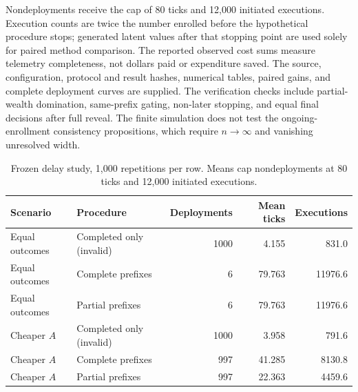 Nondeployments receive the cap of 80 ticks and 12,000 initiated executions.
Execution counts are twice the number enrolled before the hypothetical
procedure stops; generated latent values after that stopping point are
used solely for paired method comparison. The reported observed cost
sums measure telemetry completeness, not dollars paid or expenditure
saved. The source, configuration, protocol and result hashes, numerical
tables, paired gains, and complete deployment curves are supplied.
The verification checks include partial-wealth domination, same-prefix
gating, non-later stopping, and equal final decisions after full reveal.
The finite simulation does not test the ongoing-enrollment consistency
propositions, which require $n\to\infty$ and vanishing unresolved width.

\begin{table}[h]
\centering\small
\caption{Frozen delay study, 1,000 repetitions per row. Means cap
nondeployments at 80 ticks and 12,000 initiated executions.}
\begin{tabular}{llrrr}
\toprule
Scenario & Procedure & Deployments & Mean ticks & Executions\\
\midrule
Equal outcomes & Completed only (invalid) & 1000 & 4.155 & 831.0\\
Equal outcomes & Complete prefixes & 6 & 79.763 & 11976.6\\
Equal outcomes & Partial prefixes & 6 & 79.763 & 11976.6\\
Cheaper $A$ & Completed only (invalid) & 1000 & 3.958 & 791.6\\
Cheaper $A$ & Complete prefixes & 997 & 41.285 & 8130.8\\
Cheaper $A$ & Partial prefixes & 997 & 22.363 & 4459.6\\
\bottomrule
\end{tabular}
\end{table}
